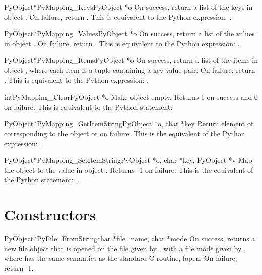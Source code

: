 \documentclass[twoside]{report}
\begin{document}
\begin{cfuncdesc}{PyObject*}{PyMapping_Keys}{PyObject *o}
On success, return a list of the keys in object .  On
failure, return \NULL{}. This is equivalent to the Python
expression: .
\end{cfuncdesc}


\begin{cfuncdesc}{PyObject*}{PyMapping_Values}{PyObject *o}
On success, return a list of the values in object .  On
failure, return \NULL{}. This is equivalent to the Python
expression: .
\end{cfuncdesc}


\begin{cfuncdesc}{PyObject*}{PyMapping_Items}{PyObject *o}
On success, return a list of the items in object , where
each item is a tuple containing a key-value pair.  On
failure, return \NULL{}. This is equivalent to the Python
expression: .
\end{cfuncdesc}

\begin{cfuncdesc}{int}{PyMapping_Clear}{PyObject *o}
Make object  empty.  Returns 1 on success and 0 on failure.
This is equivalent to the Python statement:
\end{cfuncdesc}


\begin{cfuncdesc}{PyObject*}{PyMapping_GetItemString}{PyObject *o, char *key}
Return element of  corresponding to the object  or \NULL{}
on failure. This is the equivalent of the Python expression:
.
\end{cfuncdesc}

\begin{cfuncdesc}{PyObject*}{PyMapping_SetItemString}{PyObject *o, char *key, PyObject *v}
Map the object  to the value  in object .  Returns 
-1 on failure.  This is the equivalent of the Python
statement: .
\end{cfuncdesc}


\section{Constructors}

\begin{cfuncdesc}{PyObject*}{PyFile_FromString}{char *file_name, char *mode}
On success, returns a new file object that is opened on the
file given by , with a file mode given by ,
where  has the same semantics as the standard C routine,
fopen.  On failure, return -1.
\end{cfuncdesc}
\end{document}

